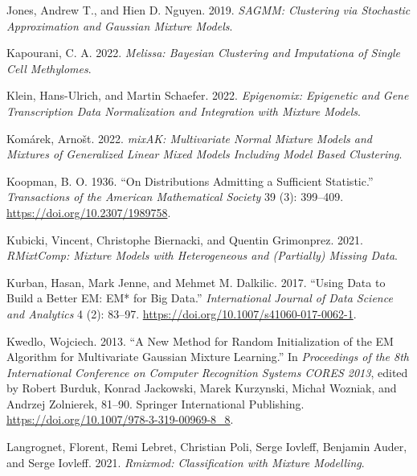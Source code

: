 \begin{CSLReferences}{1}{0}
\leavevmode{}%
Jones, Andrew T., and Hien D. Nguyen. 2019. \emph{SAGMM: Clustering via Stochastic Approximation and Gaussian Mixture Models}.

\leavevmode{}%
Kapourani, C. A. 2022. \emph{Melissa: Bayesian Clustering and Imputationa of Single Cell Methylomes}.

\leavevmode{}%
Klein, Hans-Ulrich, and Martin Schaefer. 2022. \emph{Epigenomix: Epigenetic and Gene Transcription Data Normalization and Integration with Mixture Models}.

\leavevmode{}%
Komárek, Arnošt. 2022. \emph{mixAK: Multivariate Normal Mixture Models and Mixtures of Generalized Linear Mixed Models Including Model Based Clustering}.

\leavevmode{}%
Koopman, B. O. 1936. {``On {Distributions Admitting} a {Sufficient Statistic}.''} \emph{Transactions of the American Mathematical Society} 39 (3): 399--409. \url{https://doi.org/10.2307/1989758}.

\leavevmode{}%
Kubicki, Vincent, Christophe Biernacki, and Quentin Grimonprez. 2021. \emph{RMixtComp: Mixture Models with Heterogeneous and (Partially) Missing Data}.

\leavevmode{}%
Kurban, Hasan, Mark Jenne, and Mehmet M. Dalkilic. 2017. {``Using Data to Build a Better {EM}: {EM}* for Big Data.''} \emph{International Journal of Data Science and Analytics} 4 (2): 83--97. \url{https://doi.org/10.1007/s41060-017-0062-1}.

\leavevmode{}%
Kwedlo, Wojciech. 2013. {``A {New Method} for {Random Initialization} of the {EM Algorithm} for {Multivariate Gaussian Mixture Learning}.''} In \emph{Proceedings of the {8th International Conference} on {Computer Recognition Systems CORES 2013}}, edited by Robert Burduk, Konrad Jackowski, Marek Kurzynski, Michał Wozniak, and Andrzej Zolnierek, 81--90. {Springer International Publishing}. \url{https://doi.org/10.1007/978-3-319-00969-8_8}.

\leavevmode{}%
Langrognet, Florent, Remi Lebret, Christian Poli, Serge Iovleff, Benjamin Auder, and Serge Iovleff. 2021. \emph{Rmixmod: Classification with Mixture Modelling}.


\end{CSLReferences}
